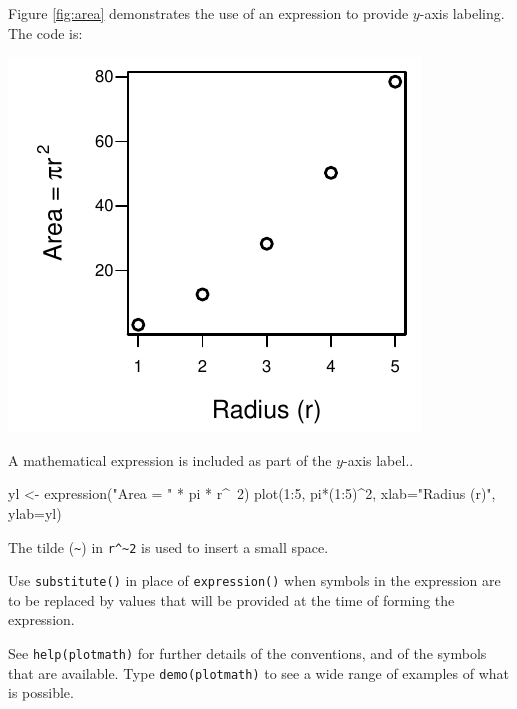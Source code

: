 \documentclass{tufte-book}\usepackage[]{graphicx}\usepackage[]{color}
\newcommand{\txtt}[1]{\texttt{#1}}
\begin{document}
Figure \ref{fig:area} demonstrates the use of an expression to
provide $y$-axis labeling.  The code is:
\begin{marginfigure}
\begin{Schunk}


\centerline{\includegraphics[width=\textwidth]{figs/09-plot-expr-1} }

\end{Schunk}
\caption{A mathematical expression is included as part of the
  $y$-axis label.\label{fig:area}.}
\end{marginfigure}
\begin{Schunk}
\begin{Sinput}
yl <- expression("Area = " * pi * r^~2)
plot(1:5, pi*(1:5)^2, xlab="Radius (r)", ylab=yl)
\end{Sinput}
\end{Schunk}
\noindent The tilde (\verb+~+) in \verb+r^~2+ is used to insert a small space.

Use \txtt{substitute()} in place of \txtt{expression()} when
symbols in the expression are to be replaced by values that
will be provided at the time of forming the expression.

See \txtt{help(plotmath)} for further details of the conventions,
and of the symbols that are available.  Type \txtt{demo(plotmath)}
to see a wide range of examples of what is possible.
\end{document}

